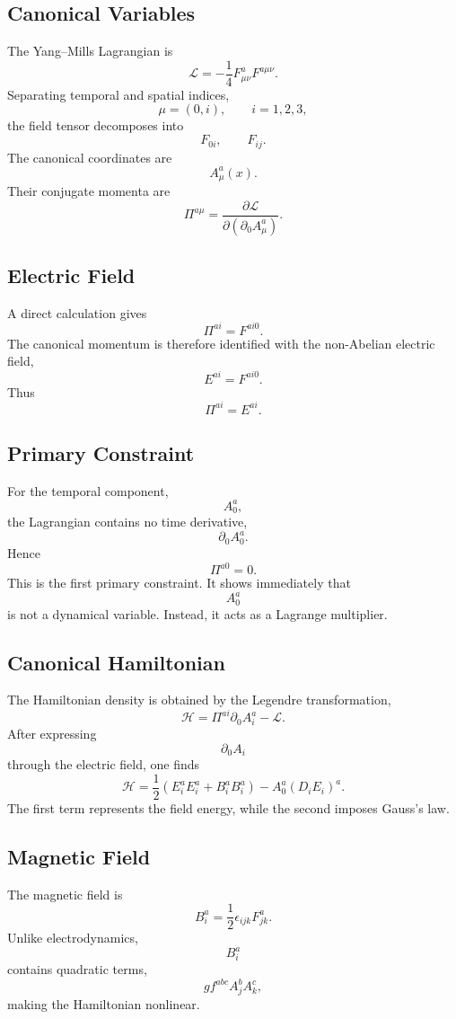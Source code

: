 \subsection{Canonical Variables}
The Yang--Mills Lagrangian is
\[\mathcal L=-\frac14F_{\mu\nu}^aF^{a\mu\nu}.\]
Separating temporal and spatial indices,
\[\mu=(0,i),\qquad i=1,2,3,\]
the field tensor decomposes into
\[F_{0i},\qquad F_{ij}.\]
The canonical coordinates are
\[A_\mu^a(x).\]
Their conjugate momenta are
\[\boxed{\Pi^{a\mu}=\frac{\partial\mathcal L}{\partial(\partial_0A_\mu^a)}.}\]
\subsection{Electric Field}
A direct calculation gives
\[\boxed{\Pi^{ai}=F^{ai0}.}\]
The canonical momentum is therefore identified with the non-Abelian
electric field,
\[E^{ai}=F^{ai0}.\]
Thus
\[\boxed{\Pi^{ai}=E^{ai}.}\]
\subsection{Primary Constraint}
For the temporal component,
\[A_0^a,\]
the Lagrangian contains no time derivative,
\[\partial_0A_0^a.\]
Hence
\[\boxed{\Pi^{a0}=0.}\]
This is the first primary constraint.
It shows immediately that
\[A_0^a\]
is not a dynamical variable.
Instead,
it acts as a Lagrange multiplier.
\subsection{Canonical Hamiltonian}
The Hamiltonian density is obtained by the Legendre transformation,
\[\boxed{\mathcal H=\Pi^{ai}\partial_0A_i^a-\mathcal L.}\]
After expressing
\[\partial_0A_i\]
through the electric field,
one finds
\[\boxed{\mathcal H=\frac12(E_i^aE_i^a+B_i^aB_i^a)-A_0^a(D_iE_i)^a.}\]
The first term represents the field energy,
while the second imposes Gauss's law.
\subsection{Magnetic Field}
The magnetic field is
\[\boxed{B_i^a=\frac12\epsilon_{ijk}F_{jk}^a.}\]
Unlike electrodynamics,
\[B_i^a\]
contains quadratic terms,
\[gf^{abc}A_j^bA_k^c,\]
making the Hamiltonian nonlinear.
